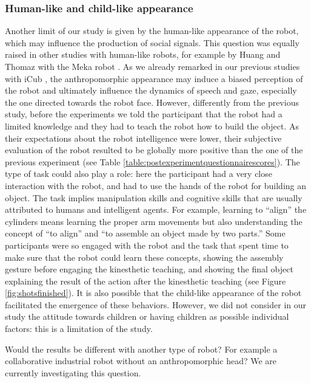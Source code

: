 \subsubsection{Human-like and child-like appearance}

Another limit of our study is given by the human-like appearance of the robot, which may influence the production of social signals. This question was equally raised in other studies with human-like robots, for example by Huang and Thomaz with the Meka robot \cite{Huang2011}.
As we already remarked in our previous studies with iCub \cite{ivaldi2014frontiers}, the anthropomorphic appearance may induce a biased perception of the robot and ultimately influence the dynamics of speech and gaze, especially the one directed towards the robot face. 
However, differently from the previous study, before the experiments we told the participant that the robot had a limited knowledge and they had to teach the robot how to build the object. As their expectations about the robot intelligence were lower, their subjective evaluation of the robot resulted to be globally more positive than the one of the previous experiment (see Table \ref{table:postexperimentquestionnairescores}). 
The type of task could also play a role: here the participant had a very close interaction with the robot, and had to use the hands of the robot for building an object. The task implies manipulation skills and cognitive skills that are usually attributed to humans and intelligent agents. For example, learning to ``align'' the cylinders means learning the proper arm movements but also understanding the concept of ``to align'' and ``to assemble an object made by two parts.'' Some participants were so engaged with the robot and the task that spent time to make sure that the robot could learn these concepts, showing the assembly gesture before engaging the kinesthetic teaching, and showing the final object explaining the result of the action after the kinesthetic teaching (see Figure \ref{fig:shotsfinished}).
It is also possible that the child-like appearance of the robot facilitated the emergence of these behaviors. However, we did not consider in our study the attitude towards children or having children as possible individual factors: this is a limitation of the study.

Would the results be different with another type of robot? For example a collaborative industrial robot without an anthropomorphic head? We are currently investigating this question.




